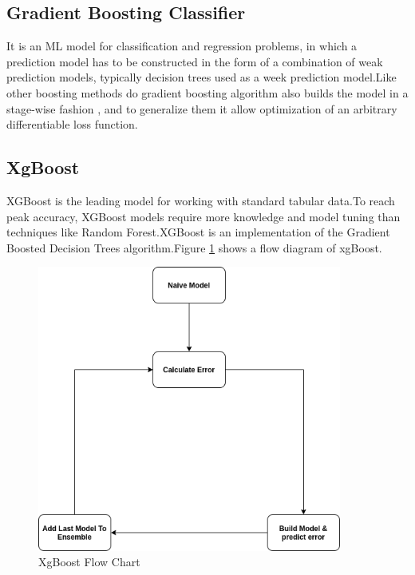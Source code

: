\subsection{Gradient Boosting Classifier}

It is an ML model for classification and regression problems, in which a prediction model has to be constructed in the form of a combination of weak prediction models, typically decision trees used as a week prediction model.Like other boosting methods do gradient boosting algorithm also builds the model in a stage-wise fashion , and to generalize them it allow optimization of an arbitrary differentiable loss function.


\subsection{XgBoost}
XGBoost is the leading model for working with standard tabular data.To reach peak accuracy, XGBoost models require more knowledge and model tuning than techniques like Random Forest.XGBoost is an implementation of the Gradient Boosted Decision Trees algorithm.Figure \ref{fig:xg_boost} shows a flow diagram of xgBoost.
\begin{figure}
    \centering
    \includegraphics[width=10cm]{Pictures/xgboost.png}
    \caption{XgBoost Flow Chart}
    \label{fig:xg_boost}
\end{figure}

